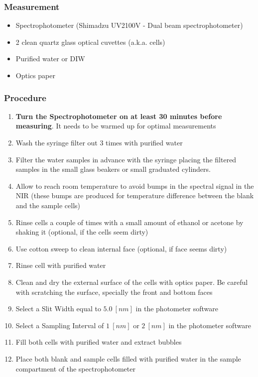 \begin{appendices}
\subsubsection*{Measurement}
\begin{itemize}[itemsep=2pt,parsep=2pt]
  \item Spectrophotometer (Shimadzu UV2100V - Dual beam spectrophotometer)
  \item 2 clean quartz glass optical cuvettes (a.k.a. cells)
  \item Purified water or DIW
  \item Optics paper
\end{itemize}
\subsubsection{Procedure}
\begin{enumerate}[itemsep=2pt,parsep=2pt]
  \item \textbf{Turn the Spectrophotometer on at least 30 minutes before measuring}. It needs to be warmed up for optimal measurements
  \item Wash the syringe filter out 3 times with purified water
  \item Filter the water samples in advance with the syringe placing the filtered samples in the small glass beakers or small graduated cylinders.
  \item Allow to reach room temperature to avoid bumps in the spectral signal in the NIR (these bumps are produced for temperature difference between the blank and the sample cells)
  \item Rinse cells a couple of times with a small amount of ethanol or acetone by shaking it (optional, if the cells seem dirty)
  \item Use cotton sweep to clean internal face (optional, if face seems dirty)
  \item Rinse cell with purified water
  \item Clean and dry the external surface of the cells with optics paper. Be careful with scratching the surface, specially the front and bottom faces
  \item Select a Slit Width equal to $5.0~[nm]$ in the photometer software
  \item Select a Sampling Interval of $1~[nm]$ or $2~[nm]$ in the photometer software
  \item Fill both cells with purified water and extract bubbles
  \item Place both blank and sample cells filled with purified water in the sample compartment of the spectrophotometer

\end{enumerate}
\end{appendices}
